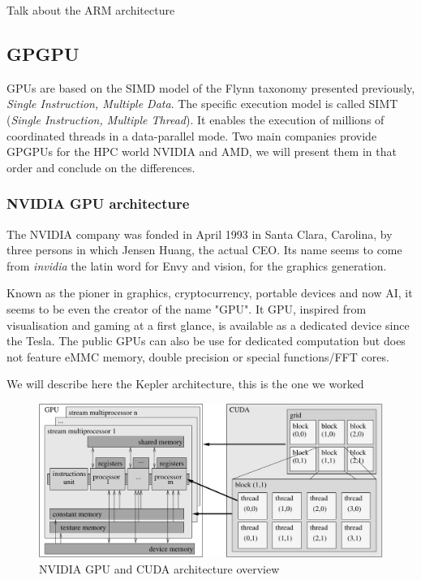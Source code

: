 Talk about the ARM architecture 

\subsection{GPGPU}

GPUs are based on the SIMD model of the Flynn taxonomy presented previously, \emph{Single Instruction, Multiple Data}.
The specific execution model is called SIMT (\emph{Single Instruction, Multiple Thread}). It enables the execution of millions of coordinated threads in a data-parallel mode. 
Two main companies provide GPGPUs for the HPC world NVIDIA and AMD, we will present them in that order and conclude on the differences. 

\subsubsection{NVIDIA GPU architecture}

The NVIDIA company was fonded in April 1993 in Santa Clara, Carolina, by three persons in which Jensen Huang, the actual CEO.
Its name seems to come from \textit{invidia} the latin word for Envy and vision, for the graphics generation. 

Known as the pioner in graphics, cryptocurrency, portable devices and now AI, it seems to be even the creator of the name "GPU".
It GPU, inspired from visualisation and gaming at a first glance, is available as a dedicated device  since the Tesla. 
The public GPUs can also be use for dedicated computation but does not feature eMMC memory, double precision or special functions/FFT cores. 

We will describe here the Kepler architecture, this is the one we worked

\begin{figure}[t!]
\centering
\setlength\fboxsep{0pt}
\setlength\fboxrule{0.25pt}
\includegraphics[scale=0.6]{figures/chap1/smx}
\caption{NVIDIA GPU and CUDA architecture overview}
 \label{fig:gpu}
\end{figure}

